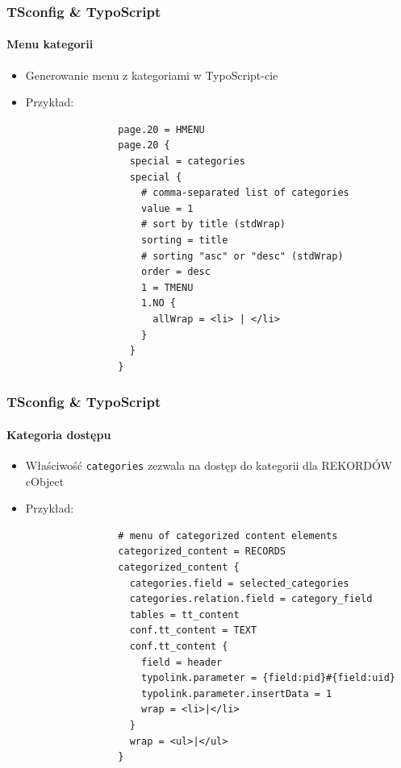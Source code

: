 
\begin{frame}[fragile]
	\frametitle{TSconfig \& TypoScript}
	\framesubtitle{Menu kategorii}

	\begin{itemize}
		\item Generowanie menu z kategoriami w TypoScript-cie

		\item Przykład:

			\lstset{
				basicstyle=\tiny\ttfamily
			}

			\begin{lstlisting}
				page.20 = HMENU
				page.20 {
				  special = categories
				  special {
				    # comma-separated list of categories
				    value = 1
				    # sort by title (stdWrap)
				    sorting = title
				    # sorting "asc" or "desc" (stdWrap)
				    order = desc
				    1 = TMENU
				    1.NO {
				      allWrap = <li> | </li>
				    }
				  }
				}
			\end{lstlisting}

	\end{itemize}

\end{frame}


\begin{frame}[fragile]
	\frametitle{TSconfig \& TypoScript}
	\framesubtitle{Kategoria dostępu}

	\begin{itemize}
		\item Właściwość \texttt{categories} zezwala na dostęp do kategorii \newline
			dla REKORDÓW cObject

		\item Przykład:

			\lstset{
				basicstyle=\tiny\ttfamily
			}

			\begin{lstlisting}
				# menu of categorized content elements
				categorized_content = RECORDS
				categorized_content {
				  categories.field = selected_categories
				  categories.relation.field = category_field
				  tables = tt_content
				  conf.tt_content = TEXT
				  conf.tt_content {
				    field = header
				    typolink.parameter = {field:pid}#{field:uid}
				    typolink.parameter.insertData = 1
				    wrap = <li>|</li>
				  }
				  wrap = <ul>|</ul>
				}
			\end{lstlisting}

	\end{itemize}

\end{frame}

